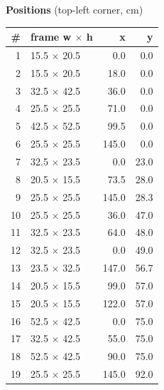 \documentclass[a4paper,landscape,10pt]{article}
\begin{document}
\begin{minipage}[t]{0.25\textwidth}
\vspace{8pt}
{\bfseries Positions} (top-left corner, cm)\\[2pt]
\tiny
\begin{tabular}{@{}r l r r@{}}
\toprule
\# & frame w $\times$ h & x & y \\
\midrule
1 & 15.5 $\times$ 20.5 & 0.0 & 0.0 \\
2 & 15.5 $\times$ 20.5 & 18.0 & 0.0 \\
3 & 32.5 $\times$ 42.5 & 36.0 & 0.0 \\
4 & 25.5 $\times$ 25.5 & 71.0 & 0.0 \\
5 & 42.5 $\times$ 52.5 & 99.5 & 0.0 \\
6 & 25.5 $\times$ 25.5 & 145.0 & 0.0 \\
7 & 32.5 $\times$ 23.5 & 0.0 & 23.0 \\
8 & 20.5 $\times$ 15.5 & 73.5 & 28.0 \\
9 & 25.5 $\times$ 25.5 & 145.0 & 28.3 \\
10 & 25.5 $\times$ 25.5 & 36.0 & 47.0 \\
11 & 32.5 $\times$ 23.5 & 64.0 & 48.0 \\
12 & 32.5 $\times$ 23.5 & 0.0 & 49.0 \\
13 & 23.5 $\times$ 32.5 & 147.0 & 56.7 \\
14 & 20.5 $\times$ 15.5 & 99.0 & 57.0 \\
15 & 20.5 $\times$ 15.5 & 122.0 & 57.0 \\
16 & 52.5 $\times$ 42.5 & 0.0 & 75.0 \\
17 & 32.5 $\times$ 42.5 & 55.0 & 75.0 \\
18 & 52.5 $\times$ 42.5 & 90.0 & 75.0 \\
19 & 25.5 $\times$ 25.5 & 145.0 & 92.0 \\
\bottomrule
\end{tabular}
\end{minipage}
\clearpage
\end{document}
